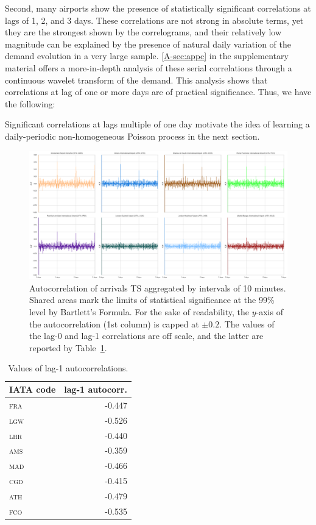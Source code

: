\documentclass[draft,review]{elsarticle}
\newcommand{\airp}[1]{\textcolor{#1}{\textsc{#1}}}
\begin{document}
Second, many airports show the presence of statistically significant correlations at lags of 1, 2, and 3 days.
These correlations are not strong in absolute terms, yet they are the strongest shown by the correlograms, and their relatively low magnitude can be explained by the presence of natural daily variation of the demand evolution in a very large sample.
\ref{A-sec:appc} in the supplementary material offers a more-in-depth analysis of these serial correlations through a continuous wavelet transform of the demand. This analysis shows that correlations at lag of one or more days are of practical significance. Thus, we have the following:
\begin{kpt}\label{rmk:correlations}
  Significant correlations at lags multiple of one day motivate the idea of learning a daily-periodic non-homogeneous Poisson process in the next section.
\end{kpt}

\begin{figure}
  \includegraphics[width=\textwidth]{Autocorr}
  \caption{Autocorrelation of arrivals \ac{TS} aggregated by intervals of 10 minutes. Shared areas mark the limits of statistical significance at the 99\% level by Bartlett's Formula. For the sake of readability, the \(y\)-axis of the autocorrelation (1st column) is capped at \(\pm 0.2\). The values of the lag-0 and lag-1 correlations are off scale, and the latter are reported by Table~\ref{tab:lag01}.}\label{fig:autocorr}
\end{figure}

\begin{table}[tbp]
  \centering
  \caption{Values of lag-1 autocorrelations.}\label{tab:lag01}
  \begin{tabular}{lr}
    \toprule
    \acs{IATA} code & lag-1 autocorr.\\
    \midrule
    \airp{fra} & -0.447\\
    \airp{lgw} & -0.526\\
    \airp{lhr} & -0.440\\
    \airp{ams} & -0.359\\
    \airp{mad} & -0.466\\
    \airp{cgd} & -0.415\\
    \airp{ath} & -0.479\\
    \airp{fco} & -0.535\\
    \bottomrule
  \end{tabular}
\end{table}
\end{document}
